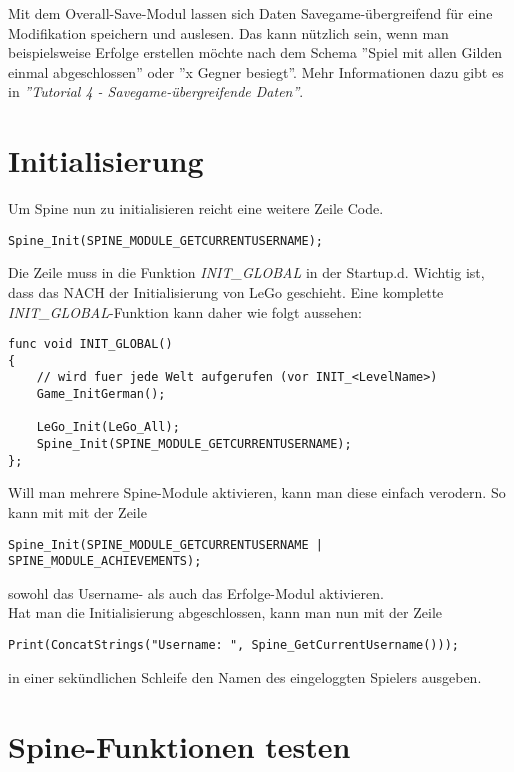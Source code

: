 \documentclass{article}
\begin{document}
Mit dem Overall-Save-Modul lassen sich Daten Savegame-übergreifend für eine Modifikation speichern und auslesen. Das kann nützlich sein, wenn man beispielsweise Erfolge erstellen möchte nach dem Schema ''Spiel mit allen Gilden einmal abgeschlossen'' oder ''x Gegner besiegt''. Mehr Informationen dazu gibt es in \textit{''Tutorial 4 - Savegame-übergreifende Daten''}.

\section{Initialisierung}

Um Spine nun zu initialisieren reicht eine weitere Zeile Code.

\begin{lstlisting}
Spine_Init(SPINE_MODULE_GETCURRENTUSERNAME);
\end{lstlisting}

Die Zeile muss in die Funktion \textit{INIT\_GLOBAL} in der Startup.d. Wichtig ist, dass das NACH der Initialisierung von LeGo geschieht. Eine komplette \textit{INIT\_GLOBAL}-Funktion kann daher wie folgt aussehen:

\begin{lstlisting}
func void INIT_GLOBAL()
{
	// wird fuer jede Welt aufgerufen (vor INIT_<LevelName>)
	Game_InitGerman();

	LeGo_Init(LeGo_All);
	Spine_Init(SPINE_MODULE_GETCURRENTUSERNAME);
};
\end{lstlisting}

Will man mehrere Spine-Module aktivieren, kann man diese einfach verodern. So kann mit mit der Zeile

\begin{lstlisting}
Spine_Init(SPINE_MODULE_GETCURRENTUSERNAME | SPINE_MODULE_ACHIEVEMENTS);
\end{lstlisting}

sowohl das Username- als auch das Erfolge-Modul aktivieren.\\

Hat man die Initialisierung abgeschlossen, kann man nun mit der Zeile

\begin{lstlisting}
Print(ConcatStrings("Username: ", Spine_GetCurrentUsername()));
\end{lstlisting}

in einer sekündlichen Schleife den Namen des eingeloggten Spielers ausgeben.

\section{Spine-Funktionen testen}
\end{document}
